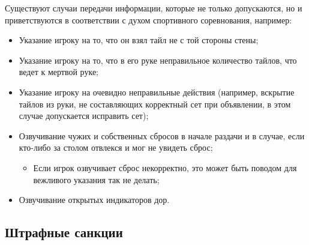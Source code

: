 Существуют случаи передачи информации, которые не только допускаются, но и приветствуются в соответствии с духом спортивного соревнования, например:
\begin{itemize}
	\item Указание игроку на то, что он взял тайл не с той стороны стены;
	\item Указание игроку на то, что в его руке неправильное количество тайлов, что ведет к мертвой руке;
	\item Указание игроку на очевидно неправильные действия (например, вскрытие тайлов из руки, не составляющих корректный сет при объявлении, в этом случае допускается исправить сет);
	\item Озвучивание чужих и собственных сбросов в начале раздачи и в случае, если кто-либо за столом отвлекся и мог не увидеть сброс;
	\begin{itemize}
		\item Если игрок озвучивает сброс некорректно, это может быть поводом для вежливого указания так не делать;
	\end{itemize}
	\item Озвучивание открытых индикаторов дор.
\end{itemize}

\subsection{Штрафные санкции}

